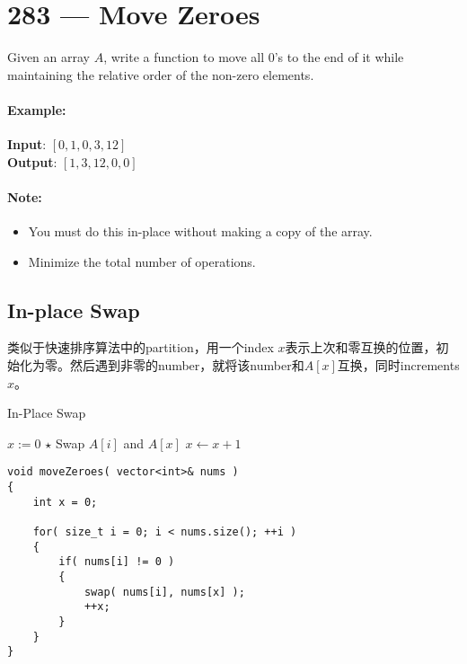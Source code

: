 \section{283 --- Move Zeroes}
Given an array $A$, write a function to move all 0's to the end of it while maintaining the relative order of the non-zero elements.

\paragraph{Example:}

\begin{flushleft}
\textbf{Input}: $[0,1,0,3,12]$
\\
\textbf{Output}: $[1,3,12,0,0]$
\end{flushleft}

\paragraph{Note:}

\begin{itemize}
\item You must do this in-place without making a copy of the array.
\item Minimize the total number of operations.
\end{itemize}
\subsection{In-place Swap}
类似于快速排序算法中的partition，用一个index $x$表示上次和零互换的位置，初始化为零。然后遇到非零的number，就将该number和$A[x]$互换，同时increments $x$。
\setcounter{algorithm}{0}
\begin{algorithm}[H]
\caption{In-Place Swap}
\begin{algorithmic}[1]
\State $x:=0$
\State $\star$ Swap $A[i]$ and $A[x]$
\State $x\gets x+1$
\EndIf
\EndFor
\EndProcedure
\end{algorithmic}
\end{algorithm}
\setcounter{lstlisting}{0}
\begin{lstlisting}[style=customc,caption={In-Place Swap}]
void moveZeroes( vector<int>& nums )
{
    int x = 0;

    for( size_t i = 0; i < nums.size(); ++i )
    {
        if( nums[i] != 0 )
        {
            swap( nums[i], nums[x] );
            ++x;
        }
    }
}
\end{lstlisting}